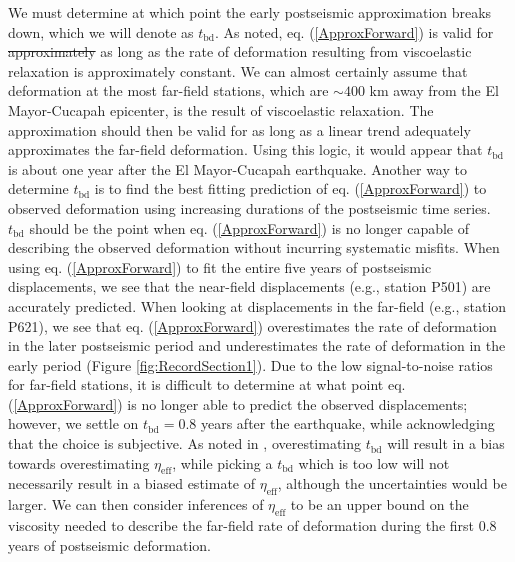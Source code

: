\documentclass[draft,linenumbers]{AGUJournal}
\providecommand{\DIFdel}[1]{{\protect\color{red}\sout{#1}}}                      %
\providecommand{\DIFdelbegin}{} %
\providecommand{\DIFdelend}{} %
\begin{document}
We must determine at which point the early postseismic approximation breaks down, which we will denote as $t_{\mathrm{bd}}$.  As noted, eq. (\ref{ApproxForward}) is valid for \DIFdelbegin \DIFdel{approximately }\DIFdelend as long as the rate of deformation resulting from viscoelastic relaxation is approximately constant. We can almost certainly assume that deformation at the most far-field stations, which are ${\sim}400$ km away from the El Mayor-Cucapah epicenter, is the result of viscoelastic relaxation. The approximation should then be valid for as long as a linear trend adequately approximates the far-field deformation. Using this logic, it would appear that $t_{\mathrm{bd}}$ is about one year after the El Mayor-Cucapah earthquake.  Another way to determine $t_{\mathrm{bd}}$ is to find the best fitting prediction of eq. (\ref{ApproxForward}) to observed deformation using increasing durations of the postseismic time series.  $t_\mathrm{bd}$ should be the point when eq. (\ref{ApproxForward}) is no longer capable of describing the observed deformation without incurring systematic misfits.  When using eq. (\ref{ApproxForward}) to fit the entire five years of postseismic displacements, we see that the near-field displacements (e.g., station P501) are accurately predicted. When looking at displacements in the far-field (e.g., station P621), we see that eq. (\ref{ApproxForward}) overestimates the rate of deformation in the later postseismic period and underestimates the rate of deformation in the early period (Figure \ref{fig:RecordSection1}).  Due to the low signal-to-noise ratios for far-field stations, it is difficult to determine at what point eq. (\ref{ApproxForward}) is no longer able to predict the observed displacements; however, we settle on $t_{\mathrm{bd}}=0.8$ years after the earthquake, while acknowledging that the choice is subjective. As noted in \citet{Hines2016}, overestimating $t_{\mathrm{bd}}$ will result in a bias towards overestimating $\eta_{\mathrm{eff}}$, while picking a $t_\mathrm{bd}$ which is too low will not necessarily result in a biased estimate of $\eta_\mathrm{eff}$, although the uncertainties would be larger. We can then consider inferences of $\eta_{\mathrm{eff}}$ to be an upper bound on the viscosity needed to describe the far-field rate of deformation during the first 0.8 years of postseismic deformation. 
\end{document}
